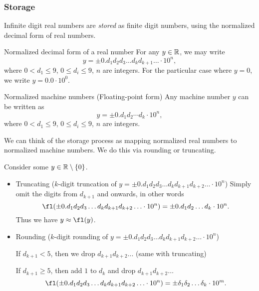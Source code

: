 \documentclass[class=article, crop=false]{standalone}
\begin{document}
  \subsubsection{Storage}
  Infinite digit real numbers are \emph{stored} as finite digit numbers, using the normalized decimal form of real numbers.
  \begin{definition}{Normalized decimal form of a real number}
    For any $y\in\mathbb{R}$, we may write
    \[
      y = \pm 0.d_1d_2d_3\dotsc d_kd_{k + 1}\dotsc\cdot 10^n,
    \]
    where $0 < d_1\leq 9$, $0\leq d_i\leq 9$, $n$ are integers. For the particular case where $y = 0$, we write $y = 0.0\cdot 10^0$.
  \end{definition}
  \begin{definition}{Normalized machine numbers (Floating-point form)}
    Any machine number $y$ can be written as
    \[
      y = \pm 0.d_1d_2\dotsb d_k\cdot 10^n,
    \]
    where $0 < d_1\leq 9$, $0\leq d_i\leq 9$, $n$ are integers.
  \end{definition}
  We can think of the storage process as mapping normalized real numbers to normalized machine numbers. We do this via rounding or truncating. \par
  Consider some $y\in\mathbb{R}\setminus \left\{0\right\}$.
  \begin{itemize}
    \item Truncating ($k$-digit truncation of $y = \pm 0.d_1d_2d_3\dotsc d_kd_{k + 1}d_{k + 2}\dotsc\cdot 10^n$)
    Simply omit the digits from $d_{k + 1}$ and onwards, in other words
    \[
      \fl(\pm 0.d_1d_2d_3\dotsc d_kd_{k + 1}d_{k + 2}\dotsc\cdot 10^n) = \pm 0.d_1d_2\dotsc d_k\cdot 10^n.
    \]
    Thus we have $y\approx \fl(y)$.
    \item Rounding ($k$-digit rounding of $y = \pm 0.d_1d_2d_3\dotsc d_kd_{k + 1}d_{k + 2}\dotsc\cdot 10^n$) \par
    If $d_{k + 1} < 5$, then we drop $d_{k + 1}d_{k + 2}\dotsc$ (same with truncating) \par
    If $d_{k + 1} \geq 5$, then add $1$ to $d_k$ and drop $d_{k + 1}d_{k + 2}\dotsc$
    \[
      \fl(\pm 0.d_1d_2d_3\dotsc d_kd_{k + 1}d_{k + 2}\dotsc\cdot 10^n) = \pm \delta_1\delta_2\dotsc \delta_k\cdot 10^m.
    \]
  \end{itemize}
\end{document}
